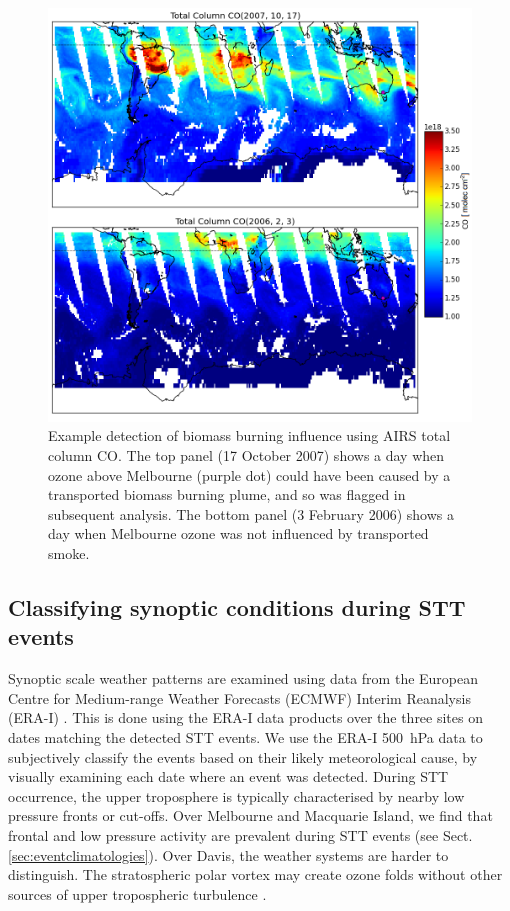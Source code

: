 \documentclass[acp, manuscript]{copernicus} %
\begin{document}
    \begin{figure}[t]
      \includegraphics[width=12cm]{figures/AIRS_compare.png}
      \caption{ %
	Example detection of biomass burning influence using AIRS total column CO. 
	The top panel (17 October 2007) shows a day when ozone above Melbourne (purple dot) could have been caused by a transported biomass burning plume, and so was flagged in subsequent analysis.
	The bottom panel (3 February 2006) shows a day when Melbourne ozone was not influenced by transported smoke.
	}
      \label{fig:excludedeg}
    \end{figure}

  \subsection{Classifying synoptic conditions during STT events}
  \label{sec:WeatherClassifications}
    Synoptic scale weather patterns are examined using data from the European Centre for Medium-range Weather Forecasts (ECMWF) Interim Reanalysis (ERA-I) \citep{Dee2011}.
    This is done using the ERA-I data products over the three sites on dates matching the detected STT events.
    We use the ERA-I 500~hPa data to subjectively classify the events based on their likely meteorological cause, by visually examining each date where an event was detected.
    During STT occurrence, the upper troposphere is typically characterised by nearby low pressure fronts or cut-offs.
    Over Melbourne and Macquarie Island, we find that frontal and low pressure activity are prevalent during STT events (see Sect. \ref{sec:eventclimatologies}).
    Over Davis, the weather systems are harder to distinguish. 
    The stratospheric polar vortex may create ozone folds without other sources of upper tropospheric turbulence \citep{Baray2000,Sprenger2003}.
\end{document}
